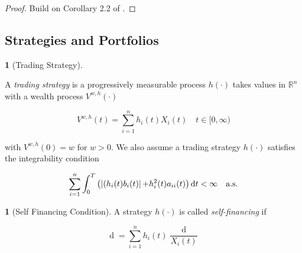 \documentclass[british]{amsart}
\numberwithin{equation}{section}
\numberwithin{figure}{section}
\theoremstyle{plain}
\theoremstyle{definition}
\newtheorem{defn}[thm]{\protect\definitionname}
\theoremstyle{plain}
\theoremstyle{plain}
\theoremstyle{plain}
\theoremstyle{remark}
\theoremstyle{plain}
\providecommand{\definitionname}{Definition}
\renewcommand{\d}[1]{\mathop{\mathrm{d}{#1}}}
\newcommand{\ranget}{t\in[0,\infty)}
\newcommand{\defeq}{\mathop{\triangleq}}
\newcommand{\almostsurely}{\text{a.s.}}
\begin{document}
\begin{proof}
	Build on Corollary 2.2 of \cite{fernholz1999}.
\end{proof}

\subsection{Strategies and Portfolios}

\begin{defn} [Trading Strategy]
	\label{def:tradingstrategy}

	A \textit{trading strategy} is a progressively measurable process $h(\cdot)$ 
	takes values in $\mathbb{R}^{n}$ with a wealth process $V^{w,h}(\cdot)$ 

 	\begin{equation*}
		V^{w,h}(t) = \sum_{i=1}^{n} h_{i}(t) X_{i}(t) 
		\quad \ranget
	\end{equation*}

	with $V^{w,h}(0)=w$ for $w > 0$. We also assume a trading strategy $h(\cdot)$  
	satisfies the integrability condition

 	\begin{equation*}
		\sum_{i=1}^{n} \int_{0}^{T} 
		\left(
		\abs{(h_{i}(t)b_{i}(t)} + h_{i}^2(t)a_{ii}(t)
			\right) \d{t} < \infty
		\quad	\almostsurely
	\end{equation*}

\end{defn}

\begin{defn} [Self Financing Condition]
	\label{def:selffinancingcondition}	
	A strategy $h(\cdot)$ is called \textit{self-financing} if 
	
	\begin{equation}
		\d{V^{w,\pi}(t)} = \sum_{i=1}^{n} h_{i}(t) \frac{\d{X_{i}(t)}}{X_{i}(t)}
 	\end{equation}

\end{defn}


%
%
%
%
\end{document}
